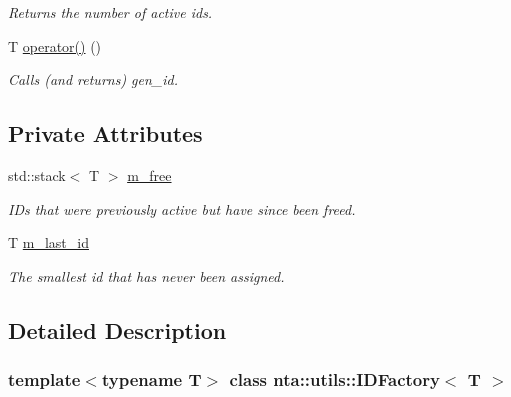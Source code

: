 \begin{DoxyCompactItemize}
\begin{DoxyCompactList}\small\item\em Returns the number of active ids. \end{DoxyCompactList}\item 
\mbox{\label{classnta_1_1utils_1_1IDFactory_a88f65b6f846fa72cbab690f69b912944}} 
T \hyperlink{classnta_1_1utils_1_1IDFactory_a88f65b6f846fa72cbab690f69b912944}{operator()} ()
\begin{DoxyCompactList}\small\item\em Calls (and returns) gen\+\_\+id. \end{DoxyCompactList}\end{DoxyCompactItemize}
\subsection*{Private Attributes}
\begin{DoxyCompactItemize}
\item 
\mbox{\label{classnta_1_1utils_1_1IDFactory_a1bb36b967e6431640bad6d843aa15db7}} 
std\+::stack$<$ T $>$ \hyperlink{classnta_1_1utils_1_1IDFactory_a1bb36b967e6431640bad6d843aa15db7}{m\+\_\+free}
\begin{DoxyCompactList}\small\item\em I\+Ds that were previously active but have since been freed. \end{DoxyCompactList}\item 
\mbox{\label{classnta_1_1utils_1_1IDFactory_a248df89e090f9d9186fc897809a59d51}} 
T \hyperlink{classnta_1_1utils_1_1IDFactory_a248df89e090f9d9186fc897809a59d51}{m\+\_\+last\+\_\+id}
\begin{DoxyCompactList}\small\item\em The smallest id that has never been assigned. \end{DoxyCompactList}\end{DoxyCompactItemize}


\subsection{Detailed Description}
\subsubsection*{template$<$typename T$>$\newline
class nta\+::utils\+::\+I\+D\+Factory$<$ T $>$}

